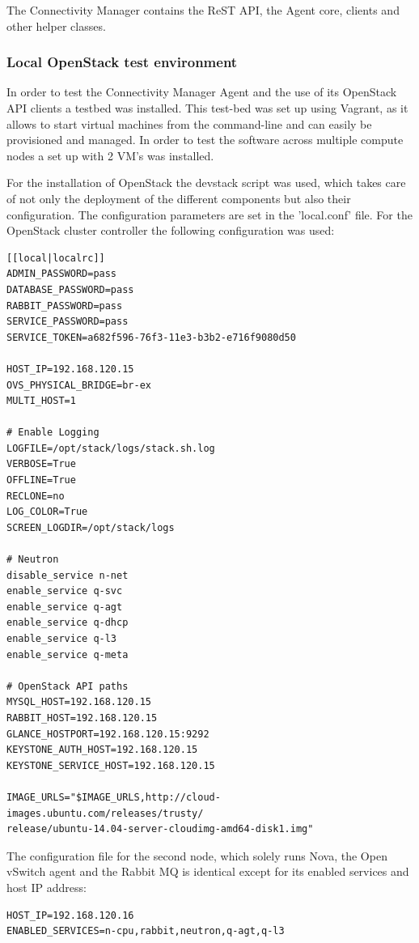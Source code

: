 The Connectivity Manager contains the ReST API, the Agent core, clients and other helper classes.

\subsubsection{Local OpenStack test environment}

In order to test the Connectivity Manager Agent and the use of its OpenStack API clients a testbed was installed. This test-bed was set up using Vagrant, as it allows to start virtual machines from the command-line and can easily be provisioned and managed. In order to test the software across multiple compute nodes a set up with 2 VM's was installed.

For the installation of OpenStack the devstack script was used, which takes care of not only the deployment of the different components but also their configuration. The configuration parameters are set in the 'local.conf' file. For the OpenStack cluster controller the following configuration was used:

\begin{lstlisting}
[[local|localrc]]
ADMIN_PASSWORD=pass
DATABASE_PASSWORD=pass
RABBIT_PASSWORD=pass
SERVICE_PASSWORD=pass
SERVICE_TOKEN=a682f596-76f3-11e3-b3b2-e716f9080d50

HOST_IP=192.168.120.15
OVS_PHYSICAL_BRIDGE=br-ex
MULTI_HOST=1

# Enable Logging
LOGFILE=/opt/stack/logs/stack.sh.log
VERBOSE=True
OFFLINE=True
RECLONE=no
LOG_COLOR=True
SCREEN_LOGDIR=/opt/stack/logs

# Neutron
disable_service n-net
enable_service q-svc
enable_service q-agt
enable_service q-dhcp
enable_service q-l3
enable_service q-meta

# OpenStack API paths
MYSQL_HOST=192.168.120.15
RABBIT_HOST=192.168.120.15
GLANCE_HOSTPORT=192.168.120.15:9292
KEYSTONE_AUTH_HOST=192.168.120.15
KEYSTONE_SERVICE_HOST=192.168.120.15

IMAGE_URLS="$IMAGE_URLS,http://cloud-images.ubuntu.com/releases/trusty/
release/ubuntu-14.04-server-cloudimg-amd64-disk1.img"
\end{lstlisting}

The configuration file for the second node, which solely runs Nova, the Open vSwitch agent and the Rabbit MQ is identical except for its enabled services and host IP address:

\begin{lstlisting}
HOST_IP=192.168.120.16
ENABLED_SERVICES=n-cpu,rabbit,neutron,q-agt,q-l3
\end{lstlisting}

